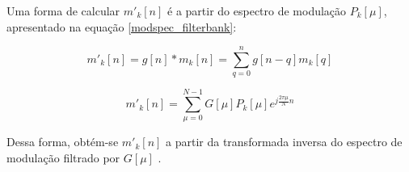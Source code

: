 Uma forma de calcular $m'_k[n]$ é a partir do espectro de modulação $P_k[\mu]$,
apresentado na equação \ref{modspec_filterbank}:

\begin{equation}
    m'_k[n] = g[n] \ast m_k[n] = \sum_{q = 0}^{n} g[n - q] m_k[q]
\end{equation}

\begin{equation}
    m'_k[n] = \sum_{\mu=0}^{N-1} G[\mu]P_k[\mu] e^{j \frac{2 \pi \mu}{N} n}
\end{equation}

Dessa forma, obtém-se $m'_k[n]$ a partir da transformada inversa do espectro de
modulação filtrado por $G[\mu]$ \cite{toolbox2010}.